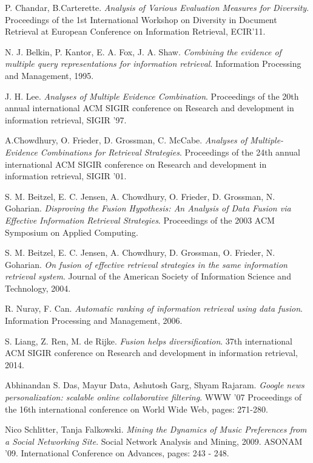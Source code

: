 \begin{thebibliography}{99}
		P. Chandar, B.Carterette.
		\emph{Analysis of Various Evaluation Measures for Diversity}.
		Proceedings of the 1st International Workshop on Diversity in Document Retrieval at European Conference on Information Retrieval,
		ECIR’11.

		N. J. Belkin, P. Kantor, E. A. Fox, J. A. Shaw.
		\emph{Combining the evidence of multiple query representations for information retrieval}.
		Information Processing and Management, 1995.

		J. H. Lee.
		\emph{Analyses of Multiple Evidence Combination}.
		Proceedings of the 20th annual international ACM SIGIR conference on Research and development in information retrieval,
		SIGIR '97.

		A.Chowdhury, O. Frieder, D. Grossman, C. McCabe.
		\emph{Analyses of Multiple-Evidence Combinations for Retrieval Strategies}.
		Proceedings of the 24th annual international ACM SIGIR conference on Research and development in information retrieval, SIGIR '01.

		S. M. Beitzel, E. C. Jensen, A. Chowdhury, O. Frieder, D. Grossman, N. Goharian.
		\emph{Disproving the Fusion Hypothesis: An Analysis of Data Fusion via Effective Information Retrieval Strategies}.
		Proceedings of the 2003 ACM Symposium on Applied Computing.

		S. M. Beitzel, E. C. Jensen, A. Chowdhury, D. Grossman, O. Frieder, N. Goharian.
		\emph{On fusion of effective retrieval strategies in the same information retrieval system}.
		Journal of the American Society of Information Science and Technology,
		2004.

		R. Nuray, F. Can.
		\emph{Automatic ranking of information retrieval using data fusion}.
		Information Processing and Management, 2006.

		S. Liang, Z. Ren, M. de Rijke.
		\emph{Fusion helps diversification}.
		37th international ACM SIGIR conference on Research and development in information retrieval,
		2014.

		Abhinandan S. Das, Mayur Data, Ashutosh Garg, Shyam Rajaram.
		\emph{Google news personalization: scalable online collaborative filtering}.
		WWW '07 Proceedings of the 16th international conference on World Wide Web,
		pages: 271-280.

		Nico Schlitter, Tanja Falkowski.
		\emph{Mining the Dynamics of Music Preferences from a Social Networking Site}.
		Social Network Analysis and Mining, 2009. ASONAM '09. International Conference on Advances,
		pages: 243 - 248.


\end{thebibliography}
